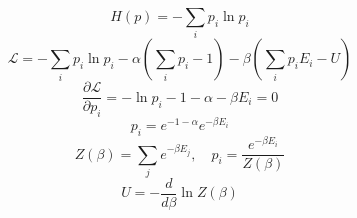 \documentclass{article}
\begin{document}
\[
H(p)=-\sum_i p_i\ln p_i
\]
\[
\mathcal L=-\sum_i p_i\ln p_i-\alpha(\sum_i p_i-1)-\beta(\sum_i p_iE_i-U)
\]
\[
\frac{\partial\mathcal L}{\partial p_i}=-\ln p_i-1-\alpha-\beta E_i=0
\]
\[
p_i=e^{-1-\alpha}e^{-\beta E_i}
\]
\[
Z(\beta)=\sum_j e^{-\beta E_j},\quad p_i=\frac{e^{-\beta E_i}}{Z(\beta)}
\]
\[
U=-\frac{d}{d\beta}\ln Z(\beta)
\]
\end{document}
